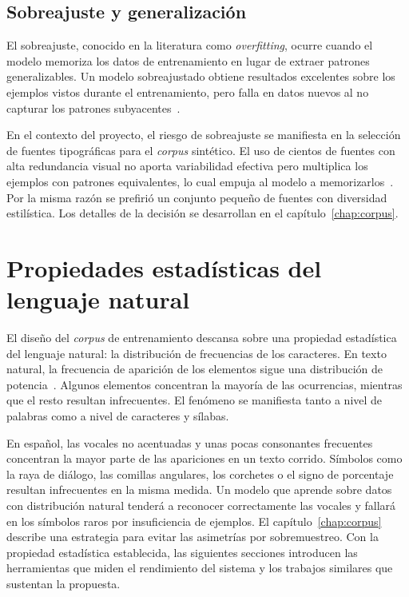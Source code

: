 \subsection{Sobreajuste y generalización}\label{subsec:sobreajuste}

El sobreajuste, conocido en la literatura como \textit{overfitting}, ocurre cuando el modelo memoriza los datos de entrenamiento en lugar de extraer patrones generalizables. Un modelo sobreajustado obtiene resultados excelentes sobre los ejemplos vistos durante el entrenamiento, pero falla en datos nuevos al no capturar los patrones subyacentes~\cite{goodfellow2016deeplearning}.

En el contexto del proyecto, el riesgo de sobreajuste se manifiesta en la selección de fuentes tipográficas para el \textit{corpus} sintético. El uso de cientos de fuentes con alta redundancia visual no aporta variabilidad efectiva pero multiplica los ejemplos con patrones equivalentes, lo cual empuja al modelo a memorizarlos~\cite{goodfellow2016deeplearning,shorten2019augmentation}. Por la misma razón se prefirió un conjunto pequeño de fuentes con diversidad estilística. Los detalles de la decisión se desarrollan en el capítulo~\ref{chap:corpus}.

\section{Propiedades estadísticas del lenguaje natural}
\label{sec:lenguaje}

El diseño del \textit{corpus} de entrenamiento descansa sobre una propiedad estadística del lenguaje natural: la distribución de frecuencias de los caracteres. En texto natural, la frecuencia de aparición de los elementos sigue una distribución de potencia~\cite{zipf1949human}. Algunos elementos concentran la mayoría de las ocurrencias, mientras que el resto resultan infrecuentes. El fenómeno se manifiesta tanto a nivel de palabras como a nivel de caracteres y sílabas.

En español, las vocales no acentuadas y unas pocas consonantes frecuentes concentran la mayor parte de las apariciones en un texto corrido. Símbolos como la raya de diálogo, las comillas angulares, los corchetes o el signo de porcentaje resultan infrecuentes en la misma medida. Un modelo que aprende sobre datos con distribución natural tenderá a reconocer correctamente las vocales y fallará en los símbolos raros por insuficiencia de ejemplos. El capítulo~\ref{chap:corpus} describe una estrategia para evitar las asimetrías por sobremuestreo. Con la propiedad estadística establecida, las siguientes secciones introducen las herramientas que miden el rendimiento del sistema y los trabajos similares que sustentan la propuesta.

